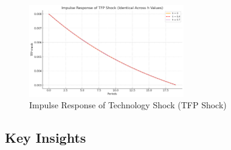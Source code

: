 \documentclass[12pt,a4paper,notitlepage]{article}
\numberwithin{equation}{section}
\begin{document}
\begin{itemize}
\begin{itemize}
\begin{itemize}
\begin{figure}[H]
  \centering
  \includegraphics[width=0.6\textwidth]{IRF_TFP_Shock.png}
  \caption{Impulse Response of Technology Shock (TFP Shock)}
  \label{fig:tfp_shock}
\end{figure}


\end{itemize}


\subsection*{Key Insights}


\end{itemize}
\end{itemize}
\end{document}
